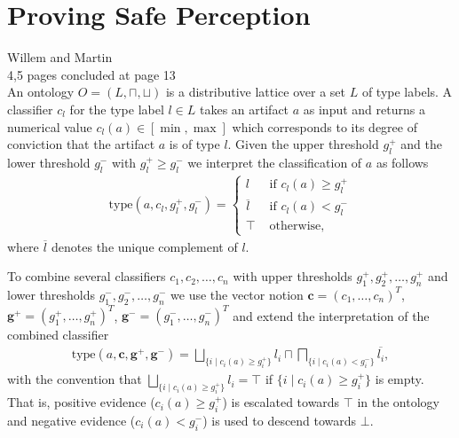 \section{Proving Safe Perception}\label{sec:proofrule}
Willem and Martin\\
4,5 pages	concluded at page 13\\

An ontology $O=(L,\sqcap,\sqcup)$ is a distributive lattice over a set $L$ of type labels. A classifier $c_l$ for the type label $l\in L$ takes an artifact $a$ as input and returns a numerical value $c_l(a) \in [\min,\max]$ which corresponds to its degree of conviction that the artifact $a$ is of type $l$.
Given the upper threshold $g_l^+$ and the lower threshold $g_l^-$ with $g_l^+\geq g_l^-$ we interpret the classification of $a$ as follows
\begin{gather*}
    \mathrm{type}(a,c_l,g_l^+,g_l^-) = \left\{
    \begin{array}{ll}
    l & \text{ if } c_l(a) \geq g_l^+\\
    \overline l & \text{ if } c_l(a) < g_l^-\\
    \top & \text{ otherwise,}
    \end{array}
\end{gather*}
where $\overline l$ denotes the unique complement of $l$.

To combine several classifiers $c_1,c_2,\dots, c_n$ with upper thresholds $g_1^+, g_2^+, \dots, g_n^+$ and lower thresholds $g_1^-, g_2^-, \dots, g_n^-$ we use the vector notion $\mathbf c = (c_1,\dots,c_n)^T$, $\mathbf g^+=(g_1^+,\dots, g_n^+)^T$, $\mathbf g^-=(g_1^-,\dots,g_n^-)^T$ and extend the interpretation of the combined classifier
\begin{gather*}
    \mathrm{type}(a,\mathbf c, \mathbf g^+,\mathbf g^-) = 
    \bigsqcup\limits_{\{i\mid c_i(a)\geq g_i^+\}} l_i \sqcap \bigsqcap\limits_{\{i\mid c_i(a)< g_i^-\}} \overline{l_i},
\end{gather*}
with the convention that $\bigsqcup_{\{i\mid c_i(a)\geq g_i^+\}} l_i=\top$ if $\{i\mid c_i(a)\geq g_i^+\}$ is empty. That is, positive evidence ($c_i(a)\geq g_i^+$) is escalated towards $\top$ in the ontology and negative evidence ($c_i(a)<g_i^-$) is used to descend towards $\bot$.







